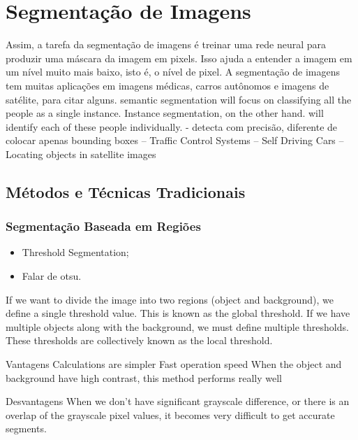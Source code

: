 \newpage
\section{Segmentação de Imagens}
Assim, a tarefa da segmentação de imagens é treinar uma rede neural para produzir uma máscara da imagem em pixels. Isso ajuda a entender a imagem em um nível muito mais baixo, isto é, o nível de pixel. A segmentação de imagens tem muitas aplicações em imagens médicas, carros autônomos e imagens de satélite, para citar alguns.
semantic segmentation will focus on classifying all the people as a single instance. Instance segmentation, on the other hand. will identify each of these people individually.
- detecta com precisão, diferente de colocar apenas bounding boxes
-- Traffic Control Systems
-- Self Driving Cars
-- Locating objects in satellite images


\subsection{Métodos e Técnicas Tradicionais}
\label{segment:segment}
\subsubsection{Segmentação Baseada em Regiões}
\begin{itemize}
    \item Threshold Segmentation;
    \item Falar de otsu.
\end{itemize}
If we want to divide the image into two regions (object and background), we define a single threshold value. This is known as the global threshold.
If we have multiple objects along with the background, we must define multiple thresholds. These thresholds are collectively known as the local threshold.

Vantagens
Calculations are simpler
Fast operation speed
When the object and background have high contrast, this method performs really well

Desvantagens
When we don’t have significant grayscale difference, or there is an overlap of the grayscale pixel values, it becomes very difficult to get accurate segments.


